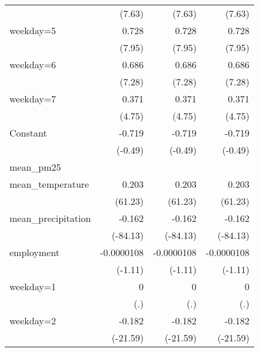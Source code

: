 \begin{table}[htbp]
\begin{tabular}{l*{3}{D{.}{.}{-1}}}
                    &      (7.63)         &      (7.63)         &      (7.63)         \\
\addlinespace
weekday=5           &       0.728\sym{***}&       0.728\sym{***}&       0.728\sym{***}\\
                    &      (7.95)         &      (7.95)         &      (7.95)         \\
\addlinespace
weekday=6           &       0.686\sym{***}&       0.686\sym{***}&       0.686\sym{***}\\
                    &      (7.28)         &      (7.28)         &      (7.28)         \\
\addlinespace
weekday=7           &       0.371\sym{***}&       0.371\sym{***}&       0.371\sym{***}\\
                    &      (4.75)         &      (4.75)         &      (4.75)         \\
\addlinespace
Constant            &      -0.719         &      -0.719         &      -0.719         \\
                    &     (-0.49)         &     (-0.49)         &     (-0.49)         \\
\midrule
mean\_pm25           &                     &                     &                     \\
mean\_temperature    &       0.203\sym{***}&       0.203\sym{***}&       0.203\sym{***}\\
                    &     (61.23)         &     (61.23)         &     (61.23)         \\
\addlinespace
mean\_precipitation  &      -0.162\sym{***}&      -0.162\sym{***}&      -0.162\sym{***}\\
                    &    (-84.13)         &    (-84.13)         &    (-84.13)         \\
\addlinespace
employment          &  -0.0000108         &  -0.0000108         &  -0.0000108         \\
                    &     (-1.11)         &     (-1.11)         &     (-1.11)         \\
\addlinespace
weekday=1           &           0         &           0         &           0         \\
                    &         (.)         &         (.)         &         (.)         \\
\addlinespace
weekday=2           &      -0.182\sym{***}&      -0.182\sym{***}&      -0.182\sym{***}\\
                    &    (-21.59)         &    (-21.59)         &    (-21.59)         \\

\end{tabular}
\end{table}
